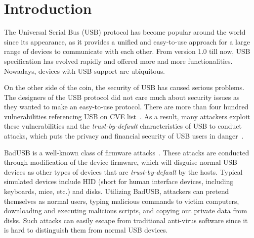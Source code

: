 \section{Introduction}
\label{sec:introduction}

The Universal Serial Bus (USB) protocol has become popular around the world since its appearance, as it provides a unified and easy-to-use approach for a large range of devices to communicate with each other.
From version 1.0 till now, USB specification has evolved rapidly and offered more and more functionalities.
Nowadays, devices with USB support are ubiquitous.

On the other side of the coin, the security of USB has caused serious problems.
The designers of the USB protocol did not care much about security issues as they wanted to make an easy-to-use protocol.
There are more than four hundred vulnerabilities referencing USB on CVE list~\cite{website:CVE-list}.
As a result, many attackers exploit these vulnerabilities and the \textit{trust-by-default} characteristics of USB to conduct attacks, which puts the privacy and financial security of USB users in danger~\cite{sok}.

BadUSB is a well-known class of firmware attacks~\cite{badusb}.
These attacks are conducted through modification of the device firmware, which will disguise normal USB devices as other types of devices that are \textit{trust-by-default} by the hosts.
Typical simulated devices include HID (short for human interface devices, including keyboards, mice, etc.) and disks.
Utilizing BadUSB, attackers can pretend themselves as normal users, typing malicious commands to victim computers, downloading and executing malicious scripts, and copying out private data from disks.
Such attacks can easily escape from traditional anti-virus software since it is hard to distinguish them from normal USB devices.

